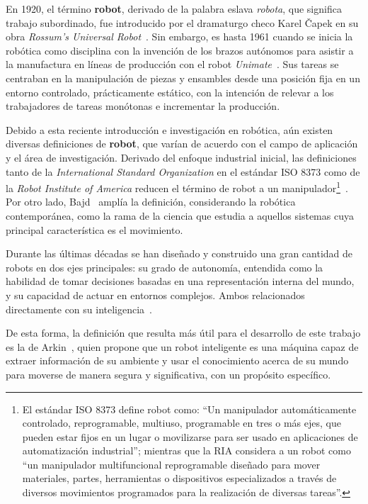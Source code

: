 En 1920, el término \textbf{robot}, derivado de la palabra eslava \emph{robota}, que significa trabajo subordinado, fue introducido por el dramaturgo checo Karel Čapek en su obra \emph{Rossum's Universal Robot}~\cite{robotics_handbook}. Sin embargo, es hasta 1961 cuando se inicia la robótica como disciplina con la invención de los brazos autónomos para asistir a la manufactura en líneas de producción con el robot \emph{Unimate}~\cite{yazmin_intro}. Sus tareas se centraban en la manipulación de piezas y ensambles desde una posición fija en un entorno controlado, prácticamente estático, con la intención de relevar a los trabajadores de tareas monótonas e incrementar la producción.

Debido a esta reciente introducción e investigación en robótica, aún existen diversas definiciones de \textbf{robot}, que varían de acuerdo con el campo de aplicación y el área de investigación. Derivado del enfoque industrial inicial, las definiciones tanto de la \emph{International Standard Organization} en el estándar ISO 8373 como de la \emph{Robot Institute of America} reducen el término de robot a un manipulador\footnote{El estándar ISO 8373 define robot como: ``Un manipulador automáticamente controlado, reprogramable, multiuso, programable en tres o más ejes, que pueden estar fijos en un lugar o movilizarse para ser usado en aplicaciones de automatización industrial''; mientras que la  RIA considera a un robot como ``un manipulador multifuncional reprogramable diseñado para mover materiales, partes, herramientas o dispositivos especializados a través de diversos movimientos programados para la realización de diversas tareas''.}~\cite{yazmin_robotsServicio}. Por otro lado, Bajd~\cite{bajd_introRobotics} amplía la definición, considerando la robótica contemporánea, como la rama de la ciencia que estudia a aquellos sistemas cuya principal característica es el movimiento.

Durante las últimas décadas se han diseñado y construido una gran cantidad de robots en dos ejes principales: su grado de autonomía, entendida como la habilidad de tomar decisiones basadas en una representación interna del mundo, y su capacidad de actuar en entornos complejos. Ambos relacionados directamente con su inteligencia~\cite{yazmin_intro}.

\hypertarget{arkin}{De esta forma, la definición que resulta más útil para el desarrollo de este trabajo es la de Arkin~\cite{arkin}, quien propone que un robot inteligente es una máquina capaz de extraer información de su ambiente y usar el conocimiento acerca de su mundo para moverse de manera segura y significativa, con un propósito específico.}

